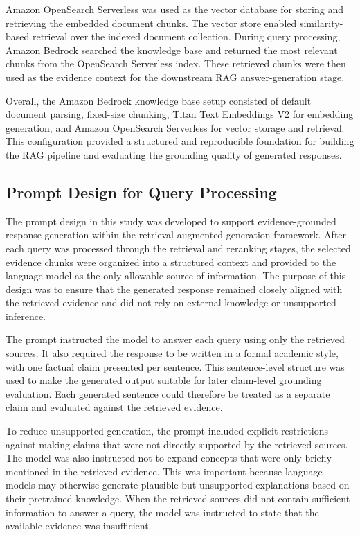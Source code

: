 Amazon OpenSearch Serverless was used as the vector database for storing and retrieving the embedded document chunks. The vector store enabled similarity-based retrieval over the indexed document collection. During query processing, Amazon Bedrock searched the knowledge base and returned the most relevant chunks from the OpenSearch Serverless index. These retrieved chunks were then used as the evidence context for the downstream RAG answer-generation stage.

Overall, the Amazon Bedrock knowledge base setup consisted of default document parsing, fixed-size chunking, Titan Text Embeddings V2 for embedding generation, and Amazon OpenSearch Serverless for vector storage and retrieval. This configuration provided a structured and reproducible foundation for building the RAG pipeline and evaluating the grounding quality of generated responses.



\subsection{Prompt Design for Query Processing}
\label{subsec:prompt_design_query}

The prompt design in this study was developed to support evidence-grounded response generation within the retrieval-augmented generation framework. After each query was processed through the retrieval and reranking stages, the selected evidence chunks were organized into a structured context and provided to the language model as the only allowable source of information. The purpose of this design was to ensure that the generated response remained closely aligned with the retrieved evidence and did not rely on external knowledge or unsupported inference.

The prompt instructed the model to answer each query using only the retrieved sources. It also required the response to be written in a formal academic style, with one factual claim presented per sentence. This sentence-level structure was used to make the generated output suitable for later claim-level grounding evaluation. Each generated sentence could therefore be treated as a separate claim and evaluated against the retrieved evidence.

To reduce unsupported generation, the prompt included explicit restrictions against making claims that were not directly supported by the retrieved sources. The model was also instructed not to expand concepts that were only briefly mentioned in the retrieved evidence. This was important because language models may otherwise generate plausible but unsupported explanations based on their pretrained knowledge. When the retrieved sources did not contain sufficient information to answer a query, the model was instructed to state that the available evidence was insufficient.


